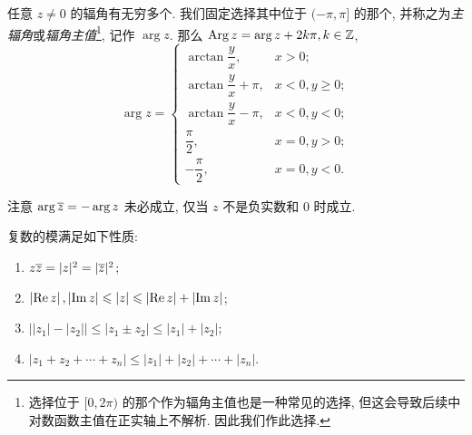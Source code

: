 任意 $z\neq 0$ 的辐角有无穷多个.
我们固定选择其中位于 $(-\pi,\pi]$ 的那个, 并称之为\emph{主辐角}或\emph{辐角主值}\footnote{选择位于 $[0,2\pi)$ 的那个作为辐角主值也是一种常见的选择, 但这会导致后续中对数函数主值在正实轴上不解析. 因此我们作此选择.}, 记作 \emph{$\arg z$}.
那么 \alert{$\operatorname{Arg} z=\arg z+2k\pi, k\in{\mathbb{Z}}$},
\[\arg z=\begin{cases}
  \arctan\dfrac yx,&x>0;\\
  \arctan\dfrac yx+\pi,&x<0,y\ge0;\\
  \arctan\dfrac yx-\pi,&x<0,y<0;\\
  \dfrac\pi2,&x=0,y>0;\\
  -\dfrac\pi2,&x=0,y<0.
\end{cases}\]

注意 \alert{$\arg \overline z=-\arg z$ 未必成立}, 仅当 $z$ 不是负实数和 $0$ 时成立.

复数的模满足如下性质:
\begin{enumerate}
  \item $z\overline z=|z|^2=|\overline z|^2$;
  \item $\left|\operatorname{Re} z\right|,\left|\operatorname{Im} z\right|\leqslant |z|\leqslant\left|\operatorname{Re} z\right|+\left|\operatorname{Im} z\right|$;
  \item $\big||z_1|-|z_2|\big|\le|z_1\pm z_2|\le|z_1|+|z_2|$;
  \item $|z_1+z_2+\cdots+z_n|\le|z_1|+|z_2|+\cdots+|z_n|$.
\end{enumerate}

